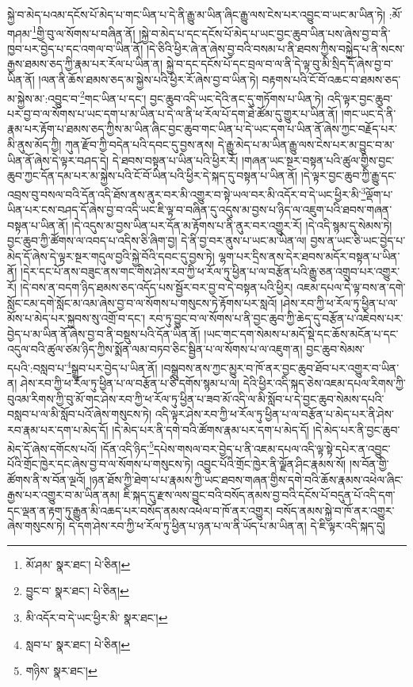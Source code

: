 སྐྱེ་བ་མེད་པའམ་དངོས་པོ་མེད་པ་གང་ཡིན་པ་དེ་ནི་རྒྱུ་མ་ཡིན་ཞིང་རྒྱུ་ལས་ངེས་པར་འབྱུང་བ་ཡང་མ་ཡིན་ཏེ། :མོ་གཤམ་\footnote{མོ་ཤམ་  སྣར་ཐང་།  པེ་ཅིན། }གྱི་བུ་ལ་སོགས་པ་བཞིན་ནོ། །སྐྱེ་བ་མེད་པ་དང་དངོས་པོ་མེད་པ་ཡང་བྱང་ཆུབ་ཡིན་པས་ཞེས་བྱ་བ་ནི་ཁྱབ་པར་བྱེད་པ་དང་འགལ་བ་ཡིན་ནོ། །དེ་ཅིའི་ཕྱིར་ཞེ་ན་ཞེས་བྱ་བའི་བསམ་པ་ནི་ཐབས་ཀྱིས་བསྐྱེད་པ་ནི་སངས་རྒྱས་ཐམས་ཅད་ཀྱི་རྣམ་པར་རོལ་པ་ཡིན་ན། སྐྱེ་བ་དང་དངོས་པོ་དང་བྲལ་བ་ལ་ནི་དེ་ལྟ་བུ་མི་སྲིད་དོ་ཞེས་བྱ་བ་ཡིན་ནོ། །ལན་ནི་ཆོས་ཐམས་ཅད་མ་སྐྱེས་པའི་ཕྱིར་རོ་ཞེས་བྱ་བ་ཡིན་ཏེ། བརྟགས་པའི་ངོ་བོ་འཆང་བ་ཐམས་ཅད་མ་སྐྱེས་མ་:འབྱུང་བ་\footnote{བྱུང་བ་  སྣར་ཐང་།  པེ་ཅིན། }གང་ཡིན་པ་དང་། བྱང་ཆུབ་འདི་ཡང་དེའི་ནང་དུ་གཏོགས་པ་ཡིན་ཏེ། འདི་ལྟར་བྱང་ཆུབ་པར་བྱ་བ་ལ་སོགས་པ་ཡང་དག་པ་མ་ཡིན་པ་དེ་ལ་ནི་ཕ་རོལ་པོ་དག་ཐེ་ཚོམ་དུ་གྱུར་པ་ཡིན་ནོ། །གང་ཡང་དེ་ནི་རྣམ་པར་རྟོག་པ་ཐམས་ཅད་ཀྱིས་མ་ཡིན་ཞིང་བྱང་ཆུབ་གང་ཡིན་པ་དེ་ཡང་དག་པ་ཡིན་ནོ་ཞེས་ཀྱང་བརྗོད་པར་མི་ནུས་མོད་ཀྱི། ཀུན་རྫོབ་ཀྱི་བདེན་པའི་དབང་དུ་བྱས་ནས། དེ་རྒྱུ་མེད་པ་མ་ཡིན་རྒྱུ་ལས་ངེས་པར་མ་བྱུང་བ་མ་ཡིན་ནོ་ཞེས་དེ་ལྟར་བཤད་དེ། དེ་ཐབས་བསྟན་པ་ཡིན་པའི་ཕྱིར་རོ། །གཞན་ཡང་སྔར་བསྟན་པའི་ཚུལ་གྱིས་བྱང་ཆུབ་ཀྱང་དོན་དམ་པར་མ་སྐྱེས་པའི་ངོ་བོ་ཡིན་པའི་ཕྱིར་དེ་སྐད་དུ་བསྟན་པ་ཡིན་ནོ། །དེ་ལྟར་བྱང་ཆུབ་ཀྱི་རྒྱུ་དང་འབྲས་བུ་བསལ་བའི་དོན་འདི་ཐོས་ནས་ནུར་བར་མི་འགྱུར་བ་སྟེ་ཡལ་བར་མི་འདོར་བ་དེ་ཡང་ཕྱིར་མི་\footnote{མི་འདོར་བ་དེ་ཡང་ཕྱིར་མི་  སྣར་ཐང་། }ལྡོག་པ་ཡིན་པར་ངས་བཤད་དོ་ཞེས་བྱ་བ་འདི་ཡང་ཇི་ལྟ་བ་བཞིན་དུ་འདུས་མ་བྱས་པ་ཉིད་ལ་འཇུག་པའི་ཐབས་གཞན་བསྟན་པ་ཡིན་ནོ། །དེ་འདུས་མ་བྱས་ཡིན་པར་དོན་མ་རྟོགས་པ་ནི་ནུར་བར་འགྱུར་རོ། །དེ་འདི་སྙམ་དུ་སེམས་ཏེ། བྱང་ཆུབ་ཀྱི་ཚོགས་ལ་འབད་པ་འདིས་ཅི་ཞིག་བྱ། དེ་ནི་བྱ་བར་ནུས་པ་ཡང་མ་ཡིན་ལ། བྱས་ན་ཡང་ཅི་ཡང་བྱེད་པ་མེད་དོ་ཞེས་དེ་ལྟར་སྔར་གདུལ་བྱའི་སྐྱེ་བོའི་དབང་དུ་བྱས་ཏེ། ལྷག་པར་དྲིས་ནས་དེར་ཐབས་མདོར་བསྟན་པ་ཡིན་ནོ། །དེར་དང་པོ་ནས་བཟུང་ནས་གང་གིས་ཤེས་རབ་ཀྱི་ཕ་རོལ་ཏུ་ཕྱིན་པ་ལ་བརྩོན་པའི་རྒྱུ་ཅན་འགྲུབ་པར་འགྱུར་རོ། །དེ་བས་ན་བདག་ཉིད་ཐམས་ཅད་འདོད་པས་སྦྱོར་བར་བྱ་བ་དེ་བསྟན་པའི་ཕྱིར། འཇམ་དཔལ་དེ་ལྟ་བས་ན་དགེ་སློང་ངམ་དགེ་སློང་མ་འམ་ཞེས་བྱ་བ་ལ་སོགས་པ་གསུངས་ཏེ་རྟོགས་པར་སླའོ། །ཤེས་རབ་ཀྱི་ཕ་རོལ་ཏུ་ཕྱིན་པ་ལ་མོས་པ་མེད་པར་སྐྱབས་སུ་འགྲོ་བ་དང་། རབ་ཏུ་བྱུང་བ་ལ་སོགས་པ་ནི་བྱང་ཆུབ་ཀྱི་ཆེད་དུ་བརྩོན་པ་འཇེབས་པར་བྱེད་པ་མ་ཡིན་ནོ་ཞེས་བྱ་བ་ནི་བསྡུས་པའི་དོན་ཡིན་ནོ། །ཡང་གང་དག་སེམས་པ་མདོ་སྡེ་དང་ཆོས་མངོན་པ་དང་འདུལ་བའི་ཚུལ་ཙམ་ཉིད་ཀྱིས་སྨོན་ལམ་བཏབ་ཅིང་སྦྱིན་པ་ལ་སོགས་པ་ལ་འཇུག་ན། བྱང་ཆུབ་སེམས་དཔའི་:བསླབ་པ་\footnote{སླབ་པ་  སྣར་ཐང་།  པེ་ཅིན། }སྒྲུབ་པར་བྱེད་པ་ཡིན་ནོ། །བསྒྲུབས་ནས་ཀྱང་མྱུར་བ་ཁོ་ནར་བྱང་ཆུབ་ཐོབ་པར་འགྱུར་བ་ཡིན་ན། ཤེས་རབ་ཀྱི་ཕ་རོལ་ཏུ་ཕྱིན་པ་ལ་བརྩོན་པ་ཅི་དགོས་སྙམ་པ་ལ། དེའི་ཕྱིར་འདི་སྐད་ཅེས་འཇམ་དཔལ་རིགས་ཀྱི་བུའམ་རིགས་ཀྱི་བུ་མོ་གང་ཤེས་རབ་ཀྱི་ཕ་རོལ་ཏུ་ཕྱིན་པ་ཟབ་མོ་འདི་ལ་མི་སློབ་པ་དེ་བྱང་ཆུབ་སེམས་དཔའི་བསླབ་པ་ལ་མི་སློབ་པའོ་ཞེས་གསུངས་ཏེ། འདི་ལྟར་ཤེས་རབ་ཀྱི་ཕ་རོལ་ཏུ་ཕྱིན་པ་ལ་བརྩོན་པ་མེད་པར་ནི་ཤེས་རབ་རྣམ་པར་དག་པ་མེད་དོ། །དེ་མེད་པར་ནི་དགེ་བའི་ཚོགས་རྣམ་པར་དག་པ་མེད་དོ། །དེ་མེད་པར་ནི་བྱང་ཆུབ་མེད་དོ་ཞེས་དགོངས་པའོ། །དོན་འདི་ཉིད་\footnote{གཉིས་  སྣར་ཐང་། }དཔེས་གསལ་བར་བྱེད་པ་ནི་འཇམ་དཔལ་འདི་ལྟ་སྟེ་དཔེར་ན་འབྱུང་པོའི་གྲོང་ཁྱེར་དང་ཞེས་བྱ་བ་ལ་སོགས་པ་གསུངས་ཏེ། འབྱུང་པོའི་གྲོང་ཁྱེར་ནི་ལྗོན་ཤིང་རྣམས་སོ། །ས་བོན་གྱི་ཚོགས་ནི་ས་བོན་ལྔའོ། །ཉན་ཐོས་ཀྱི་ཐེག་པ་པ་རྣམས་ཀྱི་ཡང་ཐབས་གཞན་གྱིས་དགེ་བའི་ཆོས་རྣམས་འཕེལ་ཞིང་རྒྱས་པར་འགྱུར་བ་མ་ཡིན་ནམ། ཇི་སྐད་དུ་རྫས་ལས་བྱུང་བའི་བསོད་ནམས་བྱ་བའི་དངོས་པོ་བདུན་པོ་འདི་དག་དང་ལྡན་ན་རྟག་ཏུ་རྒྱུན་མི་འཆད་པར་བསོད་ནམས་འཕེལ་བ་ཁོ་ནར་འགྱུར། བསོད་ནམས་སྐྱེ་བ་ཁོ་ནར་འགྱུར་ཞེས་གསུངས་ཏེ། དེ་དག་ཤེས་རབ་ཀྱི་ཕ་རོལ་ཏུ་ཕྱིན་པ་ཉན་པ་ལ་ནི་ཡོད་པ་མ་ཡིན་ན། དེ་ཇི་ལྟར་འདི་སྐད་དུ། 